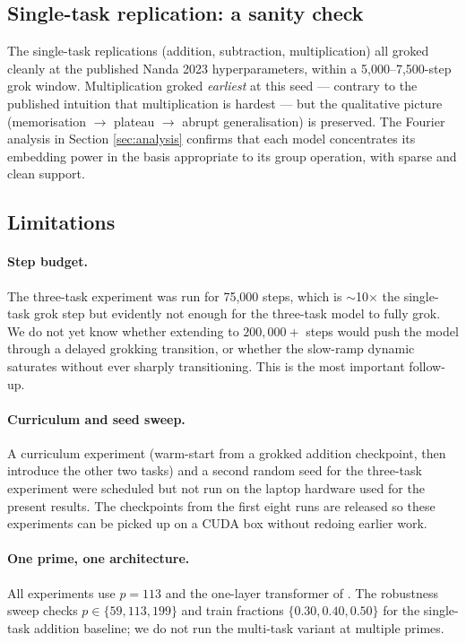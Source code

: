\subsection{Single-task replication: a sanity check}

The single-task replications (addition, subtraction, multiplication)
all groked cleanly at the published Nanda 2023 hyperparameters,
within a 5,000--7,500-step grok window. Multiplication groked
\emph{earliest} at this seed --- contrary to the published intuition
that multiplication is hardest --- but the qualitative picture
(memorisation $\to$ plateau $\to$ abrupt generalisation) is
preserved. The Fourier analysis in Section \ref{sec:analysis}
confirms that each model concentrates its embedding power in the
basis appropriate to its group operation, with sparse and clean
support.

\subsection{Limitations}

\paragraph{Step budget.}
The three-task experiment was run for 75{,}000 steps, which is
$\sim$10$\times$ the single-task grok step but evidently not enough
for the three-task model to fully grok. We do not yet know whether
extending to $200{,}000+$ steps would push the model through a
delayed grokking transition, or whether the slow-ramp dynamic
saturates without ever sharply transitioning. This is the most
important follow-up.

\paragraph{Curriculum and seed sweep.}
A curriculum experiment (warm-start from a grokked addition
checkpoint, then introduce the other two tasks) and a second
random seed for the three-task experiment were scheduled but not run
on the laptop hardware used for the present results. The
checkpoints from the first eight runs are released so these
experiments can be picked up on a CUDA box without redoing earlier
work.

\paragraph{One prime, one architecture.}
All experiments use $p = 113$ and the one-layer transformer of
\citet{nanda2023progress}. The robustness sweep checks $p \in
\{59, 113, 199\}$ and train fractions $\{0.30, 0.40, 0.50\}$ for the
single-task addition baseline; we do not run the multi-task variant
at multiple primes.

